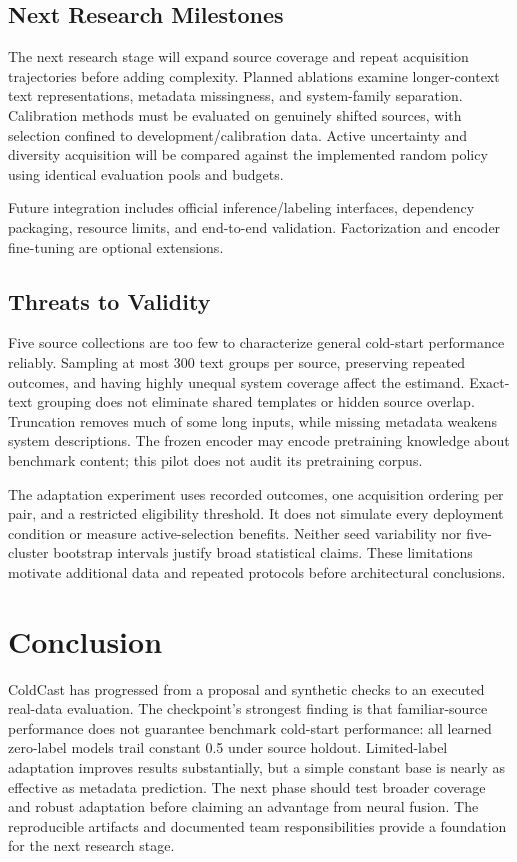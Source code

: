 \documentclass[conference]{IEEEtran}
\begin{document}
\subsection{Next Research Milestones}
The next research stage will expand source coverage and repeat acquisition trajectories before adding complexity. Planned ablations examine longer-context text representations, metadata missingness, and system-family separation. Calibration methods must be evaluated on genuinely shifted sources, with selection confined to development/calibration data. Active uncertainty and diversity acquisition will be compared against the implemented random policy using identical evaluation pools and budgets.

Future integration includes official inference/labeling interfaces, dependency packaging, resource limits, and end-to-end validation. Factorization and encoder fine-tuning are optional extensions.

\subsection{Threats to Validity}
Five source collections are too few to characterize general cold-start performance reliably. Sampling at most 300 text groups per source, preserving repeated outcomes, and having highly unequal system coverage affect the estimand. Exact-text grouping does not eliminate shared templates or hidden source overlap. Truncation removes much of some long inputs, while missing metadata weakens system descriptions. The frozen encoder may encode pretraining knowledge about benchmark content; this pilot does not audit its pretraining corpus.

The adaptation experiment uses recorded outcomes, one acquisition ordering per pair, and a restricted eligibility threshold. It does not simulate every deployment condition or measure active-selection benefits. Neither seed variability nor five-cluster bootstrap intervals justify broad statistical claims. These limitations motivate additional data and repeated protocols before architectural conclusions.

\section{Conclusion}
ColdCast has progressed from a proposal and synthetic checks to an executed real-data evaluation. The checkpoint's strongest finding is that familiar-source performance does not guarantee benchmark cold-start performance: all learned zero-label models trail constant 0.5 under source holdout. Limited-label adaptation improves results substantially, but a simple constant base is nearly as effective as metadata prediction. The next phase should test broader coverage and robust adaptation before claiming an advantage from neural fusion. The reproducible artifacts and documented team responsibilities provide a foundation for the next research stage.
\end{document}
